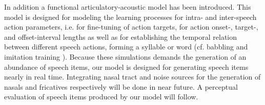 \documentclass[conference]{IEEEtran}
\begin{document}
In addition a functional articulatory-acoustic model has been
introduced. This model is designed for modeling the learning processes
for intra- and inter-speech action parameters, i.e. for fine-tuning of
action targets, for action onset-, target-, and offset-interval
lengths as well as for establishing the temporal relation between
different speech actions, forming a syllable or word (cf. babbling and
imitation training \cite{kroger2009,kroger2014}). Because these
simulations demands the generation of an abundance of speech items,
our model is designed for generating speech items nearly in real time.
Integrating nasal tract and noise sources for the generation of nasals
and fricatives respectively will be done in near future. A perceptual
evaluation of speech items produced by our model will follow.




\end{document}
